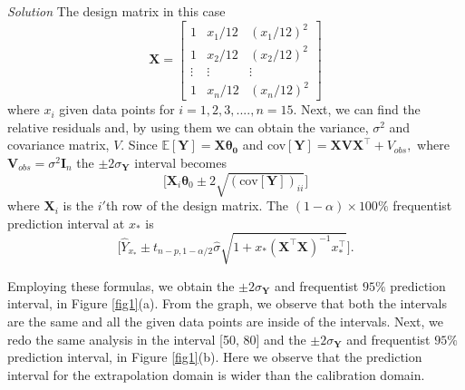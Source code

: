 \documentclass[11pt]{article}
\begin{document}
\begin{enumerate}
{\em Solution} The design matrix in this case $$\mathbf{X}=\begin{bmatrix} 1 & x_1/12 & (x_1/12)^2\\ 1 & x_2/12 & (x_2/12)^2\\
\vdots & \vdots & \vdots\\
1 & x_n/12 & (x_n/12)^2
\end{bmatrix}$$ where $x_i$ given data points for $i=1,2,3,...., n =15.$ Next, we can find the relative residuals and, by using them we can obtain the variance, $\sigma^2$ and covariance matrix, $\mathbf{}{V}.$ Since $\mathbb{E}[\mathbf{Y}] = \mathbf{X}\pmb{\theta_0}$  and cov$[\mathbf{Y}] = \mathbf{XVX}^\top + \mathbf{}{V}_{obs},$ where $\pmb{V}_{obs} = \sigma^2 \mathbf{I}_{n}$ the $\pm 2\sigma_{\pmb{Y}}$ interval  becomes 
$$ \bigg[\mathbf{X}_i \pmb{\theta}_0 \pm 2\sqrt{(\mbox{cov}[\mathbf{Y}])_{ii}} \bigg]$$ where $\mathbf{X}_i$ is the $i'$th row of the design matrix. The $(1-\alpha)\times 100\%$ frequentist prediction interval  at $x_{*}$ is $$\Bigg[\hat Y_{x_{*}} \pm t_{n-p, 1-\alpha/2}\hat\sigma  \sqrt{1+x_*(\mathbf{X^\top X})^{-1}x_{*}^\top} \Bigg].$$  

Employing these formulas, we obtain the $\pm2\sigma_\mathbf{Y}$ and frequentist $95\%$ prediction interval, in Figure \ref{fig1}(a). From the graph, we observe that both the intervals are the same and all the given data points are inside of the intervals. Next, we redo the same analysis in the interval [50, 80] and the  $\pm2\sigma_\mathbf{Y}$  and frequentist $95\%$ prediction interval, in Figure \ref{fig1}(b). Here we observe that the prediction interval for the extrapolation domain is wider than the calibration domain. 

\begin{figure*}[!htb]
   \\
\caption{Data, $2\sigma_{\mathbf{Y}}$ and prediction intervals for (a) calibration domain [58, 72] and (b)
extrapolation domain [50, 80]}
\label{fig1}
\end{figure*}


\end{enumerate}
\end{document}
